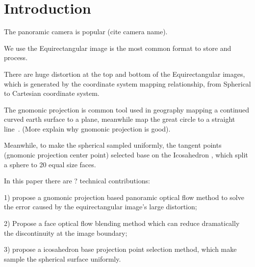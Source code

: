 \section{Introduction}\label{sec:intro}

The panoramic camera is popular (cite camera name).

We use the Equirectangular image is the most common format to store and process.

There are huge distortion at the top and bottom of the Equirectangular images, which is generated by the coordinate system mapping relationship, from Spherical to Cartesian coordinate system.

The gnomonic projection is common tool used in geography mapping a continued curved earth surface to a plane, meanwhile map the great circle to a straight line~\cite{todo}. (More explain why gnomonic projection is good).

Meanwhile, to make the spherical sampled uniformly, the tangent points (gnomonic projection center point) selected base on the Icosahedron , which split a sphere to 20 equal size faces.

In this paper there are ? technical contributions:

1) propose a gnomonic projection based panoramic optical flow method to solve the error caused by the equirectangular image's large distortion;

2) Propose a face optical flow blending method which can reduce dramatically the discontinuity at the image boundary;

3) propose a icosahedron base projection point selection method, which make sample the spherical surface uniformly.




